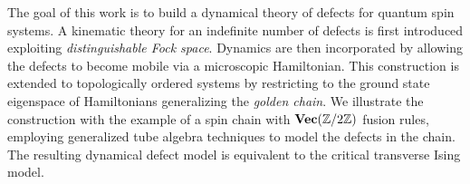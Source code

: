 The goal of this work is to build a dynamical theory of defects for quantum spin systems. A kinematic theory for an indefinite number of defects is first introduced exploiting \emph{distinguishable Fock space}. Dynamics are then incorporated by allowing the defects to become mobile via a microscopic Hamiltonian. This construction is extended to topologically ordered systems by restricting to the ground state eigenspace of Hamiltonians generalizing the \emph{golden chain}. We illustrate the construction with the example of a spin chain with $\textbf{Vec}(\mathbb{Z}/2\mathbb{Z})$ fusion rules, employing generalized tube algebra techniques to model the defects in the chain. The resulting dynamical defect model is equivalent to the critical transverse Ising model.